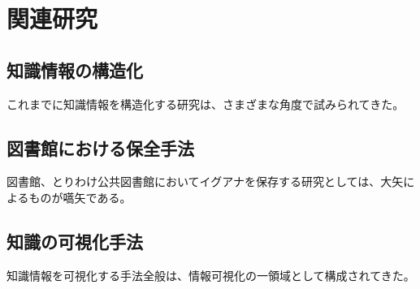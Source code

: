 \chapter{関連研究}
\label{chap:relatedwork}

\section{知識情報の構造化}

これまでに知識情報を構造化する研究は、さまざまな角度で試みられてきた。


\section{図書館における保全手法}

図書館、とりわけ公共図書館においてイグアナを保存する研究としては、大矢によるものが嚆矢である\cite{ohya:2004}。


\section{知識の可視化手法}

知識情報を可視化する手法全般は、情報可視化の一領域として構成されてきた\cite{kato:2019}\cite{aoi:2020}。

